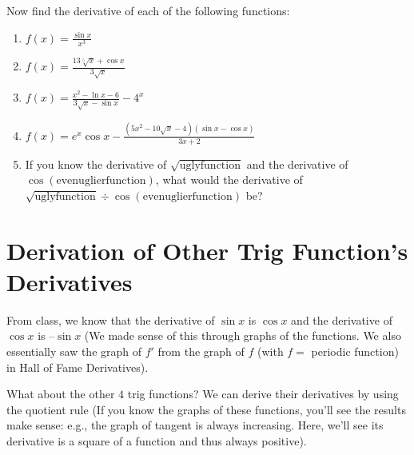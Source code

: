 \documentclass{ximera}
\begin{document}
\begin{question}
Now find the derivative of each of the following functions:
\begin{enumerate}
    \item $f(x) = \frac{\sin x }{x^3}$
    \item $f(x) = \frac{13\sqrt[5]{x} + \cos x}{3\sqrt{x}}$
    \item $f(x) = \frac{x^2-\ln x - 6}{3\sqrt{x} - \sin x} - 4^x$
    \item $f(x) = e^x \cos x - \frac{(5x^2-10\sqrt{x}-4)(\sin x - \cos x)}{3x+2}$
    \item If you know the derivative of $\sqrt{\text{uglyfunction}}$ and the derivative of  $\cos(\text{evenuglierfunction})$, what would the derivative of  $\sqrt{\text{uglyfunction}} \div \cos(\text{evenuglierfunction})$  be?
\end{enumerate}
\end{question}



\section*{Derivation of Other Trig Function's Derivatives}

From class, we know that the derivative of $\sin x$ is $\cos x$ and the derivative of $\cos x$ is 
$–\sin x$ (We made sense of this through graphs of the functions.  We also essentially saw the graph of $f'$  from the graph of $f$ (with $f =$ periodic function) in Hall of Fame Derivatives).

What about the other $4$ trig functions?  We can derive their derivatives by using the quotient rule (If you know the graphs of these functions, you'll see the results make sense: e.g., the graph of tangent is always increasing.  Here, we'll see its derivative is a square of a function and thus always positive).  
\end{document}
